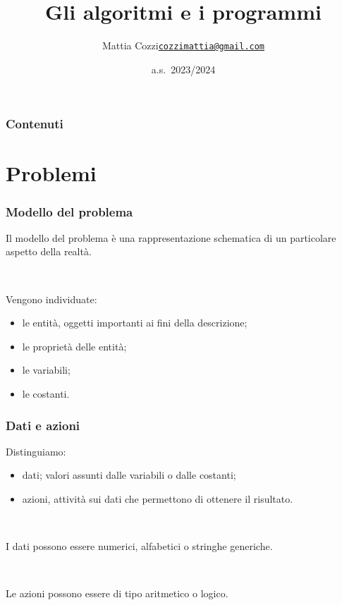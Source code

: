 \documentclass[]{beamer}
\title{Gli algoritmi e i programmi}
\author{\texorpdfstring{Mattia Cozzi\newline\href{mailto:cozzimattia@gmail.com}{\texttt{cozzimattia@gmail.com}}}{Mattia Cozzi}}
\date{a.s.~2023/2024}
\begin{document}
\begin{frame}
  \titlepage
\end{frame}


\begin{frame}
\frametitle{Contenuti}
\tableofcontents
\end{frame}

\section{Problemi}



\begin{frame}
\frametitle{Modello del problema}
Il modello del problema è una \alert<1>{rappresentazione schematica} di un particolare aspetto della realtà.\pause

~

Vengono individuate:
\begin{itemize}
  \item le entità, oggetti importanti ai fini della descrizione;\pause
  \item le proprietà delle entità;\pause
  \item le variabili;\pause
  \item le costanti.
\end{itemize}
\end{frame}

\begin{frame}
\frametitle{Dati e azioni}
Distinguiamo:
\begin{itemize}
  \item \alert<1>{dati}; valori assunti dalle variabili o dalle costanti;\pause
  \item \alert<2>{azioni}, attività sui dati che permettono di ottenere il risultato.\pause
\end{itemize}

~

I dati possono essere \alert<3>{numerici, alfabetici o stringhe generiche}.\pause

~

Le azioni possono essere \alert<4>{di tipo aritmetico o logico}.
\end{frame}
\end{document}
